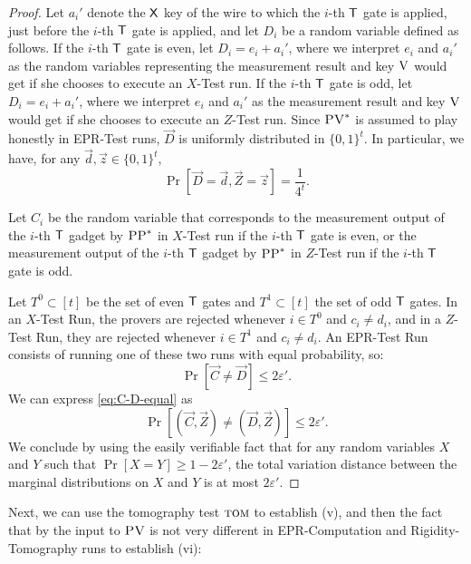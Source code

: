 \documentclass{toc}
\newcommand{\eps}{\varepsilon}
\newcommand{\tom}{\textsc{tom}}
\newcommand{\ver}{\textsc{V}}
\newcommand{\pv}{\textsc{PV}}
\newcommand{\pp}{\textsc{PP}}
\begin{document}
\begin{proof}
Let $a_i'$ denote the $\sf X$ key of the wire to which the $i$-th $\sf T$ gate is applied, just before the $i$-th $\sf T$ gate is applied, and let $D_i$ be a random variable defined as follows. If the $i$-th $\sf T$ gate is even, let $D_i=e_i+a_i'$, where we interpret $e_i$ and $a_i'$ as the random variables representing the measurement result and key $\ver$ would get if she chooses to execute an $X$-Test run. If the $i$-th $\sf T$ gate is odd, let $D_i=e_i+a_i'$, where we interpret $e_i$ and $a_i'$ as the measurement result and key $\ver$ would get if she chooses to execute an $Z$-Test run. Since $\pv^*$ is assumed to play honestly in EPR-Test runs, $\vec{D}$ is uniformly distributed in $\{0,1\}^t$. In particular, we have, for any $\vec{d},\vec{z}\in\{0,1\}^t$,
\begin{equation}
\Pr[\vec{D}=\vec{d},\vec{Z}=\vec{z}]=\frac{1}{4^t}.\label{eq:D-unif}
\end{equation}

Let $C_i$ be the random variable that corresponds to the measurement output of
  the $i$-th $\sf T$ gadget by $\pp^*$ in $X$-Test run if the $i$-th $\sf T$
  gate is even, or the measurement output of the $i$-th $\sf T$ gadget 
  by $\pp^*$ in $Z$-Test run if the $i$-th $\sf T$ gate is odd.

Let $T^0\subset[t]$ be the set of even $\sf T$ gates and $T^1\subset[t]$ the set of odd $\sf T$ gates. In an $X$-Test Run, the provers are rejected whenever $i\in T^0$ and $c_i\neq d_i$, and in a $Z$-Test Run, they are rejected whenever $i\in T^1$ and $c_i\neq d_i$. An EPR-Test Run consists of running one of these two runs with equal probability, so:
\begin{equation}
\Pr[\vec{C}\neq\vec{D}]  \leq  2\eps'.\label{eq:C-D-equal}
\end{equation}
We can express \eqref{eq:C-D-equal} as
\begin{equation*}
\Pr[(\vec{C},\vec{Z})\neq(\vec{D},\vec{Z})]  \leq  2\eps'.
\end{equation*}
We conclude by using the easily verifiable fact that for any random variables $X$ and $Y$ such that $\Pr[X= Y]\geq 1-2\eps'$, the total variation distance between the marginal distributions on $X$ and $Y$ is at most $2\eps'$. 
\end{proof}

Next, we can use the tomography test $\tom$ to establish (v), and then the fact that by  the input to $\pv$ is not very different in EPR-Computation and Rigidity-Tomography runs to establish (vi):
\end{document}

